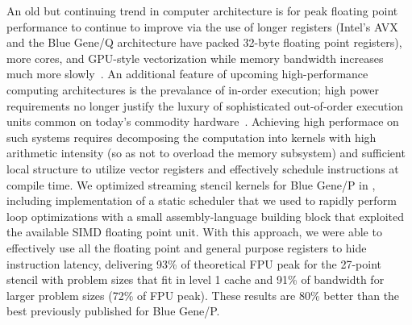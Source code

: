 An old \cite{mccalpin2007stream} but continuing trend in computer architecture is for peak floating point performance to continue to improve via the use of longer registers (Intel's AVX and the Blue Gene/Q architecture have packed 32-byte floating point registers), more cores, and GPU-style vectorization while memory bandwidth increases much more slowly~\cite{keyes2011exaflop}.
An additional feature of upcoming high-performance computing architectures is the prevalance of in-order execution; high power requirements no longer justify the luxury of sophisticated out-of-order execution units common on today's commodity hardware~\cite{seiler2008larrabee,pham2006overview}.
Achieving high performace on such systems requires decomposing the computation into kernels with high arithmetic intensity (so as not to overload the memory subsystem) and sufficient local structure to utilize vector registers and effectively schedule instructions at compile time.
We optimized streaming stencil kernels for Blue Gene/P in \cite{malas2011streaming}, including implementation of a static scheduler that we used to rapidly perform loop optimizations with a small assembly-language building block that exploited the available SIMD floating point unit.
With this approach, we were able to effectively use all the floating point and general purpose registers to hide instruction latency, delivering 93\% of theoretical FPU peak for the 27-point stencil with problem sizes that fit in level 1 cache and 91\% of bandwidth for larger problem sizes (72\% of FPU peak).
These results are 80\% better than the best previously published for Blue Gene/P.

